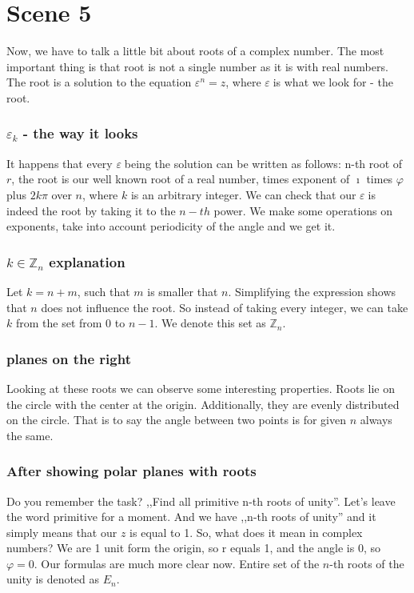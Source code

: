 \documentclass[12pt]{article}
\newcommand{\e}{\varepsilon}
\newcommand{\ve}{$\varepsilon\;$}
\newcommand{\p}{\varphi}
\newcommand{\mybox}[1]{\colorbox{Goldenrod2}{#1}}
\newcommand{\myboxx}[1]{\colorbox{SkyBlue2}{#1}}
\begin{document}
\section*{\mybox{Scene 5}}

    Now, we have to talk a little bit about roots of a complex number. The most important thing is that root is not a single number as it is with real numbers. The root is a solution to the equation $\e^n = z$, where \ve is what we look for - the root.
    
    \subsubsection*{\myboxx{$\e_k$ - the way it looks}}
    It happens that every \ve being the solution can be written as follows:  n-th root of $r$, the root is our well known root of a real number, times exponent of $\imath$ times $\p$ plus $2k\pi$ over $n$, where $k$ is an arbitrary integer. We can check that our \ve is indeed the root by taking it to the $n-th$ power. We make some operations on exponents, take into account periodicity of the angle and we get it.

    \subsubsection*{\myboxx{$k\in\mathbb{Z}_n$ explanation}}
    Let $k=n+m$, such that $m$ is smaller that $n$. Simplifying the expression shows that $n$ does not influence the root. So instead of taking every integer, we can take $k$ from the set from $0$ to $n-1$. We denote this set as $\mathbb{Z}_n$.

    \subsubsection*{\myboxx{planes on the right}}
     Looking at these roots we can observe some interesting properties. Roots lie on the circle with the center at the origin. Additionally, they are evenly distributed on the circle. That is to say the angle between two points is for given $n$ always the same.


    \subsubsection*{\myboxx{After showing polar planes with roots}}
    Do you remember the task? ,,Find all primitive n-th roots of unity''. Let's leave the word primitive for a moment. And we have ,,n-th roots of unity'' and it simply means that our $z$ is equal to 1. So, what does it mean in complex numbers? We are 1 unit form the origin, so r equals 1, and the angle is 0, so $\varphi=0$. Our formulas are much more clear now. Entire set of the $n$-th roots of the unity is denoted as $E_n$. 
\end{document}
